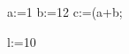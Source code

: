 \documentclass{article}
\begin{document}
 
\begin{tVar}
	a:=1
	b:=12
	c:=(a+b;
\end{tVar}
\begin{tVar}
	l:=10
\end{tVar}
\end{document}
